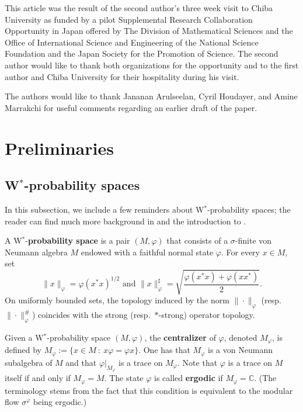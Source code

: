 \documentclass[12pt]{amsart}
\theoremstyle{definition}
\begin{document}
This article was the result of the second author's three week visit to Chiba University as funded by a pilot Supplemental Research Collaboration Opportunity in Japan offered by The Division of Mathematical Sciences and the Office of International Science and Engineering of the National Science Foundation and the Japan Society for the Promotion of Science.  The second author would like to thank both organizations for the opportunity and to the first author and Chiba University for their hospitality during his visit.  

The authors would like to thank Jananan Arulseelan, Cyril Houdayer, and Amine Marrakchi for useful comments regarding an earlier draft of the paper.

\section{Preliminaries}

\subsection{W$^*$-probability spaces}\label{subsec Wstar prob}

In this subsection, we include a few reminders about W$^*$-probability spaces; the reader can find much more background in \cite[Section 2]{AGHS25} and the introduction to \cite{goldbringhoudayer}.

A W$^*$-\textbf{probability space} is a pair $(M, \varphi)$ that consists of a $\sigma$-finite von Neumann algebra $M$ endowed with a faithful normal state $\varphi$.  For every $x \in M$, set $$\|x\|_\varphi = \varphi(x^*x)^{1/2} \text{ and }\|x\|_\varphi^\sharp = \sqrt{\frac{\varphi(x^*x) + \varphi(xx^*)}{2}}.$$ On uniformly bounded sets, the topology induced by the norm $\|\cdot\|_\varphi$ (resp.\ $\|\cdot\|_\varphi^\#$) coincides with the strong (resp.\ $\ast$-strong) operator topology.

Given a W$^*$-probability space $(M,\varphi)$, the \textbf{centralizer} of $\varphi$, denoted $M_\varphi$, is defined by $M_\varphi:=\{x\in M \ : \ x\varphi=\varphi x\}$.  One has that $M_\varphi$ is a von Neumann subalgebra of $M$ and that $\varphi|_{M_{\varphi}}$ is a trace on $M_\varphi$.  Note that $\varphi$ is a trace on $M$ itself if and only if $M_\varphi=M$.  The state $\varphi$ is called \textbf{ergodic} if $M_\varphi=\mathbb C$.  (The terminology stems from the fact that this condition is equivalent to the modular flow $\sigma^\varphi$ being ergodic.)  
\end{document}
